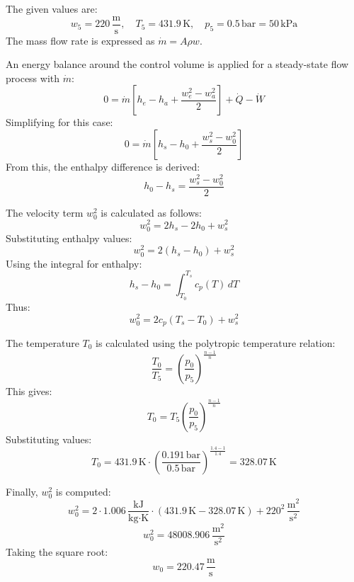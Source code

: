 The given values are:  
\[
w_5 = 220 \, \frac{\text{m}}{\text{s}}, \quad T_5 = 431.9 \, \text{K}, \quad p_5 = 0.5 \, \text{bar} = 50 \, \text{kPa}
\]  
The mass flow rate is expressed as \( \dot{m} = A \rho w \).

An energy balance around the control volume is applied for a steady-state flow process with \( \dot{m} \):  
\[
0 = \dot{m} \left[ h_e - h_a + \frac{w_e^2 - w_a^2}{2} \right] + \dot{Q} - \dot{W}
\]  
Simplifying for this case:  
\[
0 = \dot{m} \left[ h_s - h_0 + \frac{w_s^2 - w_0^2}{2} \right]
\]  
From this, the enthalpy difference is derived:  
\[
h_0 - h_s = \frac{w_s^2 - w_0^2}{2}
\]  

The velocity term \( w_0^2 \) is calculated as follows:  
\[
w_0^2 = 2 h_s - 2 h_0 + w_s^2
\]  
Substituting enthalpy values:  
\[
w_0^2 = 2 \left( h_s - h_0 \right) + w_s^2
\]  
Using the integral for enthalpy:  
\[
h_s - h_0 = \int_{T_0}^{T_s} c_p(T) \, dT
\]  
Thus:  
\[
w_0^2 = 2 c_p \left( T_s - T_0 \right) + w_s^2
\]  

The temperature \( T_0 \) is calculated using the polytropic temperature relation:  
\[
\frac{T_0}{T_5} = \left( \frac{p_0}{p_5} \right)^{\frac{n-1}{n}}
\]  
This gives:  
\[
T_0 = T_5 \left( \frac{p_0}{p_5} \right)^{\frac{n-1}{n}}
\]  
Substituting values:  
\[
T_0 = 431.9 \, \text{K} \cdot \left( \frac{0.191 \, \text{bar}}{0.5 \, \text{bar}} \right)^{\frac{1.4 - 1}{1.4}} = 328.07 \, \text{K}
\]  

Finally, \( w_0^2 \) is computed:  
\[
w_0^2 = 2 \cdot 1.006 \, \frac{\text{kJ}}{\text{kg·K}} \cdot (431.9 \, \text{K} - 328.07 \, \text{K}) + 220^2 \, \frac{\text{m}^2}{\text{s}^2}
\]  
\[
w_0^2 = 48008.906 \, \frac{\text{m}^2}{\text{s}^2}
\]  
Taking the square root:  
\[
w_0 = 220.47 \, \frac{\text{m}}{\text{s}}
\]